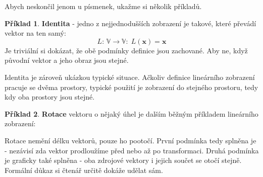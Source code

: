 \documentclass[a5paper,12pt]{amsbook}
\theoremstyle{definition}
\newtheorem{example}{Příklad}[chapter]
\newcommand{\myvec}[1]{\mathbf{#1}}
\newcommand{\myspace}[1]{\mathbb{#1}}
\newcommand{\mymap}[1]{#1}
\begin{document}
Abych neskončil jenom u písmenek, ukažme si několik příkladů.

\begin{example}\textbf{Identita} - jedno z nejjednodušších zobrazení je takové, které převádí vektor
na ten samý:
\begin{equation*}
\mymap{L}:\,\myspace{V}\rightarrow\myspace{V}:\;\mymap{L}(\myvec{x})=\myvec{x}
\end{equation*} 
Je triviální si dokázat, že obě podmínky definice jsou zachované. Aby ne, když původní vektor
a jeho obraz jsou stejné.

Identita je zároveň ukázkou typické situace. Ačkoliv definice lineárního zobrazení pracuje se dvěma
prostory, typické použití je zobrazení do stejného prostoru, tedy kdy oba prostory jsou stejné.

\end{example}

\begin{example}\label{example:rotate}\textbf{Rotace} vektoru o nějaký úhel je dalším běžným příkladem
lineárního zobrazení:
\begin{center}

\end{center}
Rotace nemění délku vektorů, pouze ho pootočí. První podmínka tedy splněna je - nezávisí zda
vektor prodloužíme před nebo až po transformaci. Druhá podmínka je graficky také splněna - oba zdrojové
vektory i jejich součet se otočí stejně. Formální důkaz si čtenář určitě dokáže udělat sám.

\end{example}
\end{document}
